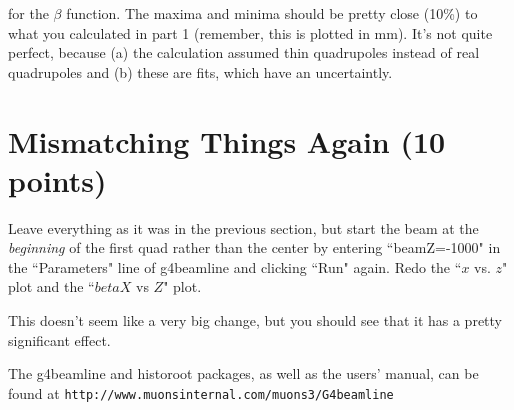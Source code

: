 \documentclass{article}
\begin{document}
for the $\beta$ function.  The maxima and minima should be pretty close (10\%) to what you calculated in part 1 (remember, this is plotted in mm).  It's not quite perfect, because (a) the calculation assumed thin quadrupoles instead of real quadrupoles and (b) these are fits, which have an uncertaintly.

\section{Mismatching Things Again (10 points)}

Leave everything as it was in the previous section, but start the beam at the {\em beginning} of the first quad rather than the center by entering ``beamZ=-1000" in the ``Parameters" line of g4beamline and clicking ``Run" again.  Redo the ``$x$ vs. $z$" plot and the ``$betaX$ vs $Z$" plot. 

This doesn't seem like a very big change, but you should see that it has a pretty significant effect.

\begin{thebibliography}{2}
 The g4beamline and historoot packages, as well as the users' manual, can be found at 
\verb+http://www.muonsinternal.com/muons3/G4beamline+
\end{thebibliography}
\end{document}
